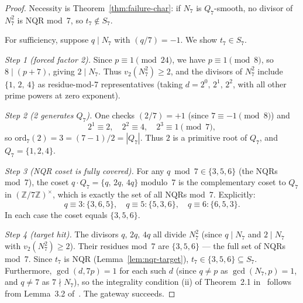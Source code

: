 \documentclass[12pt]{amsart}
\theoremstyle{definition}
\theoremstyle{remark}
\begin{document}
\begin{proof}
Necessity is Theorem~\ref{thm:failure-char}: if $N_7$ is $Q_7$-smooth,
no divisor of $N_7^2$ is NQR mod~7, so $t_7 \notin S_7$.

For sufficiency, suppose $q \mid N_7$ with $(q/7) = -1$.
We show $t_7 \in S_7$.

\textit{Step 1 (forced factor 2).}
Since $p \equiv 1 \pmod{24}$, we have $p \equiv 1 \pmod{8}$,
so $8 \mid (p+7)$, giving $2 \mid N_7$.
Thus $v_2(N_7^2) \ge 2$, and the divisors of $N_7^2$ include
$\{1,\, 2,\, 4\}$ as residue-mod-7 representatives
(taking $d = 2^0,\, 2^1,\, 2^2$, with all other prime powers at zero exponent).

\textit{Step 2 (2 generates $Q_7$).}
One checks $(2/7) = +1$ (since $7 \equiv -1 \pmod 8$) and
\[
  2^1 \equiv 2,\quad 2^2 \equiv 4,\quad 2^3 \equiv 1 \pmod{7},
\]
so $\mathrm{ord}_7(2) = 3 = (7-1)/2 = |Q_7|$.
Thus $2$ is a primitive root of $Q_7$, and $Q_7 = \{1, 2, 4\}$.

\textit{Step 3 (NQR coset is fully covered).}
For any $q \bmod 7 \in \{3, 5, 6\}$ (the NQRs mod~7),
the coset $q \cdot Q_7 = \{q,\, 2q,\, 4q\}$ modulo~7 is the complementary
coset to $Q_7$ in $(\mathbb{Z}/7\mathbb{Z})^\times$,
which is exactly the set of all NQRs mod~7.
Explicitly:
\[
  q \equiv 3: \{3, 6, 5\},\quad
  q \equiv 5: \{5, 3, 6\},\quad
  q \equiv 6: \{6, 5, 3\}.
\]
In each case the coset equals $\{3, 5, 6\}$.

\textit{Step 4 (target hit).}
The divisors $q,\, 2q,\, 4q$ all divide $N_7^2$
(since $q \mid N_7$ and $2 \mid N_7$ with $v_2(N_7^2) \ge 2$).
Their residues mod~7 are $\{3, 5, 6\}$ --- the full set of NQRs mod~7.
Since $t_7$ is NQR (Lemma~\ref{lem:nqr-target}),
$t_7 \in \{3, 5, 6\} \subseteq S_7$.
Furthermore, $\gcd(d, 7p) = 1$ for each such $d$
(since $q \neq p$ as $\gcd(N_7, p) = 1$, and $q \neq 7$ as $7 \nmid N_7$),
so the integrality condition (ii) of Theorem~2.1 in~\cite{Gateway2026}
follows from Lemma~3.2 of~\cite{Gateway2026}.
The gateway succeeds.
\end{proof}
\end{document}

